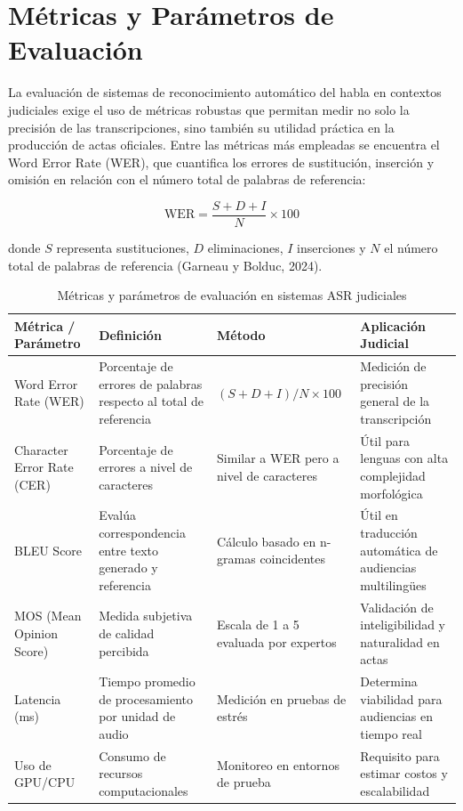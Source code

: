 \documentclass[12pt,a4paper,oneside]{report}
\begin{document}
\section{Métricas y Parámetros de Evaluación}

La evaluación de sistemas de reconocimiento automático del habla en contextos judiciales exige el uso de métricas robustas que permitan medir no solo la precisión de las transcripciones, sino también su utilidad práctica en la producción de actas oficiales. Entre las métricas más empleadas se encuentra el Word Error Rate (WER), que cuantifica los errores de sustitución, inserción y omisión en relación con el número total de palabras de referencia:

\begin{equation}
\text{WER} = \frac{S + D + I}{N} \times 100
\end{equation}

donde $S$ representa sustituciones, $D$ eliminaciones, $I$ inserciones y $N$ el número total de palabras de referencia (Garneau y Bolduc, 2024).

\begin{table}[H]
\centering
\caption{Métricas y parámetros de evaluación en sistemas ASR judiciales}
\begin{tabular}{|p{3cm}|p{3.5cm}|p{3cm}|p{3cm}|}
\hline
\rowcolor{gray!20}
\textbf{Métrica / Parámetro} & \textbf{Definición} & \textbf{Método} & \textbf{Aplicación Judicial} \\
\hline
Word Error Rate (WER) & Porcentaje de errores de palabras respecto al total de referencia & $(S+D+I)/N\times100$ & Medición de precisión general de la transcripción \\
\hline
Character Error Rate (CER) & Porcentaje de errores a nivel de caracteres & Similar a WER pero a nivel de caracteres & Útil para lenguas con alta complejidad morfológica \\
\hline
BLEU Score & Evalúa correspondencia entre texto generado y referencia & Cálculo basado en n-gramas coincidentes & Útil en traducción automática de audiencias multilingües \\
\hline
MOS (Mean Opinion Score) & Medida subjetiva de calidad percibida & Escala de 1 a 5 evaluada por expertos & Validación de inteligibilidad y naturalidad en actas \\
\hline
Latencia (ms) & Tiempo promedio de procesamiento por unidad de audio & Medición en pruebas de estrés & Determina viabilidad para audiencias en tiempo real \\
\hline
Uso de GPU/CPU & Consumo de recursos computacionales & Monitoreo en entornos de prueba & Requisito para estimar costos y escalabilidad \\
\hline
\end{tabular}
\label{tab:metricas}
\end{table}
\end{document}
